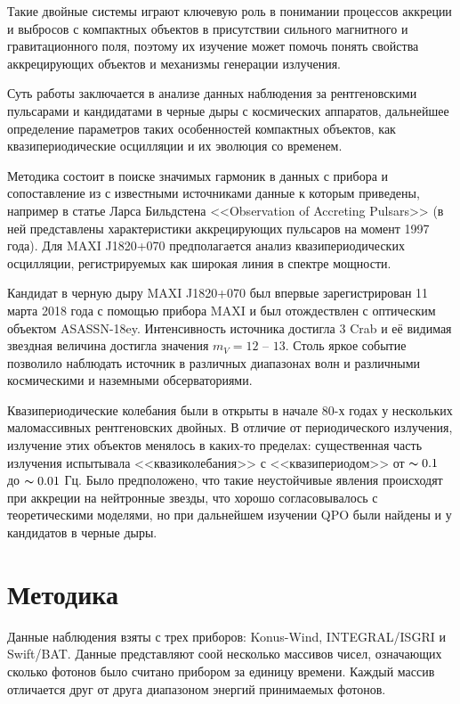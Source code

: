 	Такие двойные системы играют ключевую роль в понимании процессов аккреции и выбросов с компактных объектов в присутствии сильного магнитного и гравитационного поля, поэтому их изучение может помочь понять свойства аккрецирующих объектов и механизмы генерации излучения.
	
	Суть работы заключается в анализе данных наблюдения за рентгеновскими пульсарами и 	кандидатами в черные дыры с космических аппаратов, дальнейшее определение параметров таких особенностей компактных объектов, как квазипериодические осцилляции и их эволюция со временем.
	
	Методика состоит в поиске значимых гармоник в данных с прибора и сопоставление из с известными источниками данные к которым приведены, например в статье Ларса Бильдстена <<Observation of Accreting Pulsars>> (в ней представлены характеристики аккрецирующих пульсаров на момент 1997 года). Для MAXI J1820+070 предполагается анализ квазипериодических осцилляции, регистрируемых как широкая линия в спектре мощности.
	
	Кандидат в черную дыру MAXI J1820+070 был впервые зарегистрирован 11 марта 2018 года с помощью прибора MAXI и был отождествлен с оптическим объектом ASASSN-18ey. Интенсивность источника достигла 3 Crab и её видимая звездная величина достигла значения $m_{V} = 12$ -- $13$. Столь яркое событие позволило наблюдать источник в различных диапазонах волн и различными космическими и наземными обсерваториями.  
	
	Квазипериодические колебания были в открыты в начале 80-х годах у нескольких маломассивных рентгеновских двойных. В отличие от периодического излучения, излучение этих объектов менялось в каких-то пределах: существенная часть излучения испытывала <<квазиколебания>> с <<квазипериодом>> от $\thicksim 0.1$ до $\thicksim 0.01$ Гц. Было предположено, что такие неустойчивые явления происходят при аккреции на нейтронные звезды, что хорошо согласовывалось с теоретическими моделями, но при дальнейшем изучении QPO были найдены и у кандидатов в черные дыры.
	
\section{Методика}
	
	Данные наблюдения взяты с трех приборов: Konus-Wind, INTEGRAL/ISGRI и Swift/BAT. Данные представляют соой несколько массивов чисел, означающих сколько фотонов было считано прибором за единицу времени. Каждый массив отличается друг от друга диапазоном энергий принимаемых фотонов.
	
